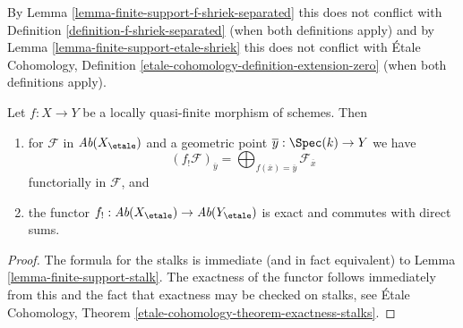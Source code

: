 \noindent
By Lemma \ref{lemma-finite-support-f-shriek-separated}
this does not conflict with Definition \ref{definition-f-shriek-separated}
(when both definitions apply) and by
Lemma \ref{lemma-finite-support-etale-shriek}
this does not conflict with
\'Etale Cohomology, Definition \ref{etale-cohomology-definition-extension-zero}
(when both definitions apply).

\begin{lemma}
\label{lemma-lqf-f-shriek-stalk}
Let $f : X \to Y$ be a locally quasi-finite morphism of schemes. Then
\begin{enumerate}
\item for $\mathcal{F}$ in $\textit{Ab}(X_\etale)$ and a geometric
point $\overline{y} : \Spec(k) \to Y$ we have
$$
(f_!\mathcal{F})_{\overline{y}} =
\bigoplus\nolimits_{f(\overline{x}) = \overline{y}} \mathcal{F}_{\overline{x}}
$$
functorially in $\mathcal{F}$, and
\item the functor $f_! : \textit{Ab}(X_\etale) \to \textit{Ab}(Y_\etale)$
is exact and commutes with direct sums.
\end{enumerate}
\end{lemma}

\begin{proof}
The formula for the stalks is immediate (and in fact equivalent) to
Lemma \ref{lemma-finite-support-stalk}.
The exactness of the functor follows immediately from this
and the fact that exactness may be checked on stalks, see
\'Etale Cohomology, Theorem \ref{etale-cohomology-theorem-exactness-stalks}.
\end{proof}

